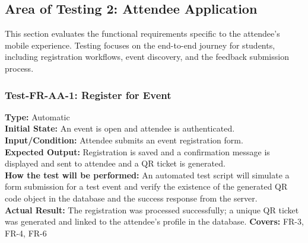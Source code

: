 \documentclass[12pt, titlepage]{article}
\begin{document}
\subsection{Area of Testing 2: Attendee Application}
This section evaluates the functional requirements specific to the attendee's mobile experience. Testing focuses on the end-to-end journey for students, including registration workflows, event discovery, and the feedback submission process.

\subsubsection{Test-FR-AA-1: Register for Event}
\textbf{Type:} Automatic \\
\textbf{Initial State:} An event is open and attendee is authenticated. \\
\textbf{Input/Condition:} Attendee submits an event registration form. \\
\textbf{Expected Output:} Registration is saved and a confirmation message is displayed and sent to attendee and a QR ticket is generated. \\
\textbf{How the test will be performed:} An automated test script will simulate a form submission for a test event and verify the existence of the generated QR code object in the database and the success response from the server. \\
\textbf{Actual Result:} The registration was processed successfully; a unique QR ticket was generated and linked to the attendee's profile in the database.
\textbf{Covers:} FR-3, FR-4, FR-6 \\
\end{document}
